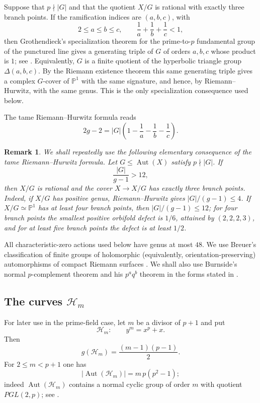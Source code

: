 \documentclass[10pt,a4paper]{amsart}
\newtheorem{remark}[theorem]{Remark}
\newcommand{\Aut}{\operatorname{Aut}}
\newcommand{\PP}{\mathbb P}
\newcommand{\cH}{\mathcal H}
\begin{document}
Suppose that $p\nmid|G|$ and that the quotient $X/G$ is rational with
exactly three branch points.  If the ramification indices are
$(a,b,c)$, with
\[
       2\le a\le b\le c,\qquad
       \frac1a+\frac1b+\frac1c<1,
\]
then Grothendieck's specialization theorem for the prime-to-$p$
fundamental group of the punctured line gives a generating triple of $G$
of orders $a,b,c$ whose product is $1$; see
\cite[Expos\'e~XIII, Corollaire~2.12]{SGA1}.  Equivalently, $G$ is a
finite quotient of the hyperbolic triangle group $\Delta(a,b,c)$.  By the
Riemann existence theorem this same generating triple gives a complex
$G$-cover of $\PP^1$ with the same signature, and hence, by
Riemann--Hurwitz, with the same genus.  This is the only specialization
consequence used below.

The tame Riemann--Hurwitz formula reads
\begin{equation}\label{eq:triangleRH}
  2g-2
   =|G|\left(1-\frac1a-\frac1b-\frac1c\right).
\end{equation}

\begin{remark}\label{rem:threebranch}
We shall repeatedly use the following elementary consequence of the tame
Riemann--Hurwitz formula.  Let $G\le\Aut(X)$ satisfy $p\nmid|G|$. If
\[
        \frac{|G|}{g-1}>12,
\]
then $X/G$ is rational and the cover $X\to X/G$ has exactly three branch
points.  Indeed, if $X/G$ has positive genus, Riemann--Hurwitz gives
$|G|/(g-1)\le4$.  If $X/G\simeq\PP^1$ has at least four branch points,
then $|G|/(g-1)\le12$; for four branch points the smallest positive
orbifold defect is $1/6$, attained by $(2,2,2,3)$, and for at least five
branch points the defect is at least $1/2$.
\end{remark}

All characteristic-zero actions used below have genus at most $48$.
We use Breuer's classification of finite groups of holomorphic
(equivalently, orientation-preserving) automorphisms of compact Riemann
surfaces \cite[Chapter~5 and the summary table on p.~91]{Breuer}.
We shall also use Burnside's normal $p$-complement theorem and his
$p^a q^b$ theorem in the forms stated in
\cite[Theorems~5.13 and~7.8]{Isaacs}.

\subsection{\texorpdfstring{The curves $\cH_m$}{The curves Hm}}

For later use in the prime-field case, let $m$ be a divisor of $p+1$ and put
\[
            \cH_m:\qquad y^m=x^p+x .
\]
Then
\begin{equation}\label{eq:Hmgenus}
            g(\cH_m)=\frac{(m-1)(p-1)}2.
\end{equation}
For $2\le m<p+1$ one has
\begin{equation}\label{eq:Hmaut}
            |\Aut(\cH_m)|=m\,p(p^2-1);
\end{equation}
indeed $\Aut(\cH_m)$ contains a normal cyclic group of order $m$ with
quotient $PGL(2,p)$; see \cite[Lemma~2.3]{BMT}.
\end{document}
